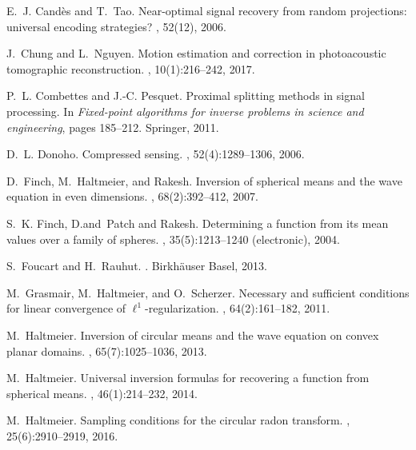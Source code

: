\documentclass[11pt]{article}
\begin{document}
\begin{thebibliography}{10}
	E.~J. Cand{\`e}s and T.~Tao.
	\newblock Near-optimal signal recovery from random projections: universal
	encoding strategies?
	, 52(12), 2006.
	
	J.~Chung and L.~Nguyen.
	\newblock Motion estimation and correction in photoacoustic tomographic
	reconstruction.
	, 10(1):216--242, 2017.
	
	P.~L. Combettes and J.-C. Pesquet.
	\newblock Proximal splitting methods in signal processing.
	\newblock In {\em Fixed-point algorithms for inverse problems in science and
		engineering}, pages 185--212. Springer, 2011.
	
	D.~L. Donoho.
	\newblock Compressed sensing.
	, 52(4):1289--1306, 2006.
	
	D.~Finch, M.~Haltmeier, and Rakesh.
	\newblock Inversion of spherical means and the wave equation in even
	dimensions.
	, 68(2):392--412, 2007.
	
	S.~K. Finch, D.and~Patch and Rakesh.
	\newblock Determining a function from its mean values over a family of spheres.
	, 35(5):1213--1240 (electronic), 2004.
	
	S.~Foucart and H.~Rauhut.
	.
	\newblock Birkh{\"a}user Basel, 2013.
	
	M.~Grasmair, M.~Haltmeier, and O.~Scherzer.
	\newblock Necessary and sufficient conditions for linear convergence of
	$\ell^1$-regularization.
	, 64(2):161--182, 2011.
	
	M.~Haltmeier.
	\newblock Inversion of circular means and the wave equation on convex planar
	domains.
	, 65(7):1025--1036, 2013.
	
	M.~Haltmeier.
	\newblock Universal inversion formulas for recovering a function from spherical
	means.
	, 46(1):214--232, 2014.
	
	M.~Haltmeier.
	\newblock Sampling conditions for the circular radon transform.
	, 25(6):2910--2919, 2016.
	

\end{thebibliography}
\end{document}
